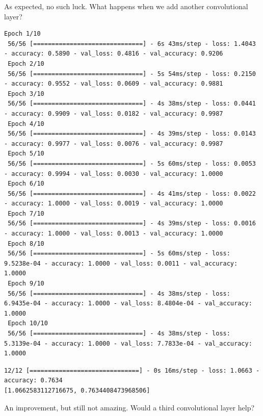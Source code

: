 \documentclass{article}
\begin{document}
As expected, no such luck. What happens when we add another convolutional layer?



\begin{lstlisting}[style=output]
 Epoch 1/10
 56/56 [==============================] - 6s 43ms/step - loss: 1.4043 - accuracy: 0.5890 - val_loss: 0.4816 - val_accuracy: 0.9206
 Epoch 2/10
 56/56 [==============================] - 5s 54ms/step - loss: 0.2150 - accuracy: 0.9552 - val_loss: 0.0609 - val_accuracy: 0.9881
 Epoch 3/10
 56/56 [==============================] - 4s 38ms/step - loss: 0.0441 - accuracy: 0.9909 - val_loss: 0.0182 - val_accuracy: 0.9987
 Epoch 4/10
 56/56 [==============================] - 4s 39ms/step - loss: 0.0143 - accuracy: 0.9977 - val_loss: 0.0076 - val_accuracy: 0.9987
 Epoch 5/10
 56/56 [==============================] - 5s 60ms/step - loss: 0.0053 - accuracy: 0.9994 - val_loss: 0.0030 - val_accuracy: 1.0000
 Epoch 6/10
 56/56 [==============================] - 4s 41ms/step - loss: 0.0022 - accuracy: 1.0000 - val_loss: 0.0019 - val_accuracy: 1.0000
 Epoch 7/10
 56/56 [==============================] - 4s 39ms/step - loss: 0.0016 - accuracy: 1.0000 - val_loss: 0.0013 - val_accuracy: 1.0000
 Epoch 8/10
 56/56 [==============================] - 5s 60ms/step - loss: 9.5238e-04 - accuracy: 1.0000 - val_loss: 0.0011 - val_accuracy: 1.0000
 Epoch 9/10
 56/56 [==============================] - 4s 38ms/step - loss: 6.9435e-04 - accuracy: 1.0000 - val_loss: 8.4804e-04 - val_accuracy: 1.0000
 Epoch 10/10
 56/56 [==============================] - 4s 38ms/step - loss: 5.3139e-04 - accuracy: 1.0000 - val_loss: 7.7833e-04 - val_accuracy: 1.0000
\end{lstlisting}



\begin{lstlisting}[style=output]
12/12 [==============================] - 0s 16ms/step - loss: 1.0663 - accuracy: 0.7634
[1.0662583112716675, 0.7634408473968506]
\end{lstlisting}

An improvement, but still not amazing. Would a third convolutional layer help?


\end{document}
